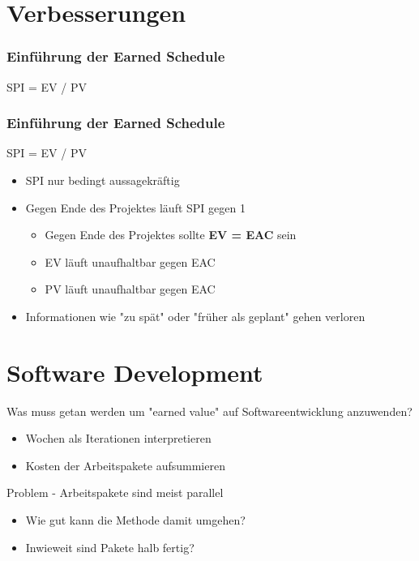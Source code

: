 \documentclass{f4_beamer}
\begin{document}
\section{Verbesserungen}
\begin{frame}[fragile]
    \frametitle{Einführung der Earned Schedule}
    \begin{center}
        \LARGE
        SPI = EV / PV
    \end{center}
\end{frame}
\begin{frame}[fragile]
    \frametitle{Einführung der Earned Schedule}
    \begin{center}
        \LARGE
        SPI = EV / PV
    \end{center}
    \Large
    \begin{itemize}
        \item SPI nur bedingt aussagekräftig
        \item Gegen Ende des Projektes läuft SPI gegen 1
        \begin{itemize}
            \item Gegen Ende des Projektes sollte \textbf{EV = EAC} sein
            \item EV läuft unaufhaltbar gegen EAC
            \item PV läuft unaufhaltbar gegen EAC
        \end{itemize}
        \item Informationen wie "zu spät" oder "früher als geplant" gehen verloren
    \end{itemize}
\end{frame}


\section{Software Development}
\begin{frame}[fragile]
    Was muss getan werden um "earned value" auf Softwareentwicklung anzuwenden?
    \begin{itemize}
        \item Wochen als Iterationen interpretieren
        \item Kosten der Arbeitspakete aufsummieren
    \end{itemize}
\end{frame}
\begin{frame}[fragile]
    Problem - Arbeitspakete sind meist parallel
    \begin{itemize}
        \item Wie gut kann die Methode damit umgehen?
        \item Inwieweit sind Pakete halb fertig?
    \end{itemize}
\end{frame}
\end{document}
